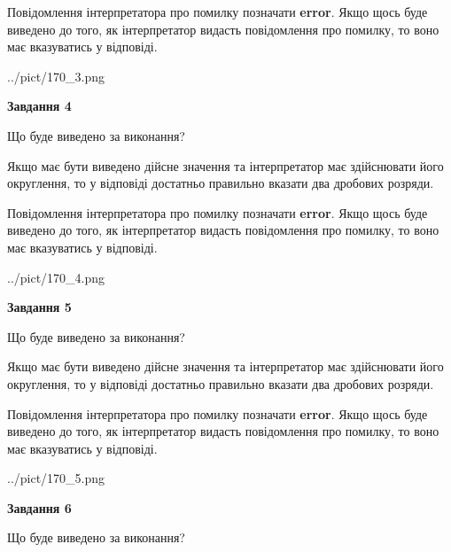 \documentclass[12pt, ukrainian]{article}
\begin{document}
{\begin {Large}
Повідомлення інтерпретатора про помилку позначати \textbf{error}.
Якщо щось буде виведено до того, як інтерпретатор видасть повідомлення про помилку, 
то воно має вказуватись у відповіді. \par

\begin{center}
	{../pict/170_3.png}
\end{center}
\newpage

{\begin {center}\textbf{Завдання 4}\end {center}}\par
Що буде виведено за виконання? \par

Якщо має бути виведено дійсне значення та інтерпретатор має здійснювати його округлення, 
то у відповіді достатньо правильно вказати два дробових розряди.

Повідомлення інтерпретатора про помилку позначати \textbf{error}.
Якщо щось буде виведено до того, як інтерпретатор видасть повідомлення про помилку, 
то воно має вказуватись у відповіді. \par

\begin{center}
	{../pict/170_4.png}
\end{center}
\newpage

{\begin {center}\textbf{Завдання 5}\end {center}}\par
Що буде виведено за виконання? \par

Якщо має бути виведено дійсне значення та інтерпретатор має здійснювати його округлення, 
то у відповіді достатньо правильно вказати два дробових розряди.

Повідомлення інтерпретатора про помилку позначати \textbf{error}.
Якщо щось буде виведено до того, як інтерпретатор видасть повідомлення про помилку, 
то воно має вказуватись у відповіді. \par

\begin{center}
	{../pict/170_5.png}
\end{center}
\newpage

{\begin {center}\textbf{Завдання 6}\end {center}}\par
Що буде виведено за виконання? \par


\end{Large}}
\end{document}
